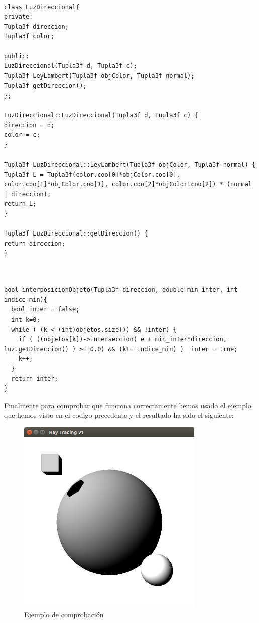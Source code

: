 \begin{lstlisting}[style=Consola]

class LuzDireccional{
private:
Tupla3f direccion;
Tupla3f color;

public:
LuzDireccional(Tupla3f d, Tupla3f c);
Tupla3f LeyLambert(Tupla3f objColor, Tupla3f normal);
Tupla3f getDireccion();
};

LuzDireccional::LuzDireccional(Tupla3f d, Tupla3f c) {
direccion = d;
color = c;
}

Tupla3f LuzDireccional::LeyLambert(Tupla3f objColor, Tupla3f normal) {
Tupla3f L = Tupla3f(color.coo[0]*objColor.coo[0], color.coo[1]*objColor.coo[1], color.coo[2]*objColor.coo[2]) * (normal | direccion);
return L;
}

Tupla3f LuzDireccional::getDireccion() {
return direccion;
}


\end{lstlisting}


\begin{lstlisting}[style=Consola]

bool interposicionObjeto(Tupla3f direccion, double min_inter, int indice_min){
  bool inter = false;
  int k=0;
  while ( (k < (int)objetos.size()) && !inter) {
    if ( ((objetos[k])->interseccion( e + min_inter*direccion, luz.getDireccion() ) >= 0.0) && (k!= indice_min) )  inter = true;
    k++;
  }
  return inter;
}
\end{lstlisting}



Finalmente para comprobar que funciona correctamente hemos usado el ejemplo que hemos visto en el codigo precedente y el resultado ha sido el siguiente:

\begin{figure}
	\begin{center}
		\includegraphics[width=0.8\textwidth]{imagenes/prueba.png}
	\end{center}
	\caption{Ejemplo de comprobación}
	\label{fig:etiq_9}
\end{figure}

